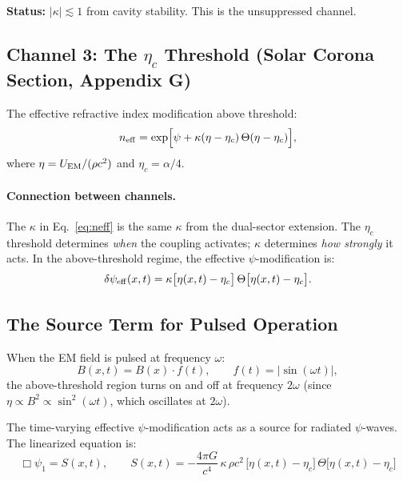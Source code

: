 \documentclass[11pt]{article}
\newcommand{\etac}{\eta_c}
\newcommand{\neff}{n_{\rm eff}}
\begin{document}
\textbf{Status:} $|\kappa| \lesssim 1$ from cavity stability. This is the
unsuppressed channel.

\subsection{Channel 3: The $\etac$ Threshold (Solar Corona Section, Appendix G)}

The effective refractive index modification above threshold:
\begin{equation}\label{eq:neff}
\neff = \exp\!\Big[\psi + \kappa(\eta - \etac)\,\Theta(\eta - \etac)\Big],
\end{equation}
where $\eta = U_{\rm EM}/(\rho c^2)$ and $\etac = \alpha/4$.

\paragraph{Connection between channels.}
The $\kappa$ in Eq.~\eqref{eq:neff} is the same $\kappa$ from the dual-sector
extension. The $\etac$ threshold determines \emph{when} the coupling activates;
$\kappa$ determines \emph{how strongly} it acts. In the above-threshold regime,
the effective $\psi$-modification is:
\begin{equation}
\delta\psi_{\rm eff}(x,t) = \kappa\big[\eta(x,t) - \etac\big]\,
  \Theta\big[\eta(x,t) - \etac\big].
\end{equation}

\subsection{The Source Term for Pulsed Operation}

When the EM field is pulsed at frequency $\omega$:
\begin{equation}
B(x,t) = B(x) \cdot f(t), \qquad f(t) = |\sin(\omega t)|,
\end{equation}
the above-threshold region turns on and off at frequency $2\omega$ (since
$\eta \propto B^2 \propto \sin^2(\omega t)$, which oscillates at $2\omega$).

The time-varying effective $\psi$-modification acts as a source for radiated
$\psi$-waves. The linearized equation is:
\begin{equation}\label{eq:wave-equation}
\boxed{\Box \psi_1 = S(x,t), \qquad
S(x,t) = -\frac{4\pi G}{c^4}\,\kappa\,\rho c^2\,
  \big[\eta(x,t) - \etac\big]\,\Theta\big[\eta(x,t) - \etac\big]}
\end{equation}
\end{document}
